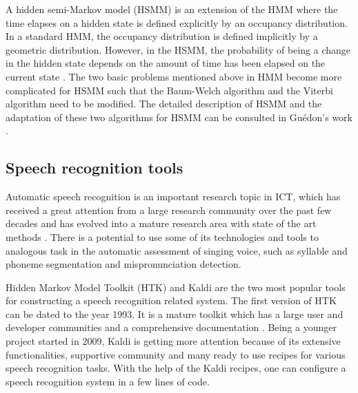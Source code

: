 A hidden semi-Markov model (HSMM) is an extension of the HMM where the time elapses on a hidden state is defined explicitly by an occupancy distribution. In a standard HMM, the occupancy distribution is defined implicitly by a geometric distribution. However, in the HSMM, the probability of being a change in the hidden state depends on the amount of time has been elapsed on the current state \cite{Wikipedia}. The two basic problems mentioned above in HMM become more complicated for HSMM such that the Baum-Welch algorithm and the Viterbi algorithm need to be modified. The detailed description of HSMM and the adaptation of these two algorithms for HSMM can be consulted in Guédon's work \cite{GUEDON20072379}.

\subsection{Speech recognition tools}\label{sec:ch2:speech_tools}

Automatic speech recognition is an important research topic in ICT, which has received a great attention from a large research community over the past few decades and has evolved into a mature research area with state of the art methods \cite{an-overview-of-modern-speech-recognition}. There is a potential to use some of its technologies and tools to analogous task in the automatic assessment of singing voice, such as syllable and phoneme segmentation and mispronunciation detection.

Hidden Markov Model Toolkit (HTK) \cite{HTKteam} and Kaldi \cite{Povey2011ASRU} are the two most popular tools for constructing a speech recognition related system. The first version of HTK can be dated to the year 1993. It is a mature toolkit which has a large user and developer communities and a comprehensive documentation \cite{Young2006HTK}. Being a younger project started in 2009, Kaldi is getting more attention because of its extensive functionalities, supportive community and many ready to use recipes for various speech recognition tasks. With the help of the Kaldi recipes, one can configure a speech recognition system in a few lines of code.
